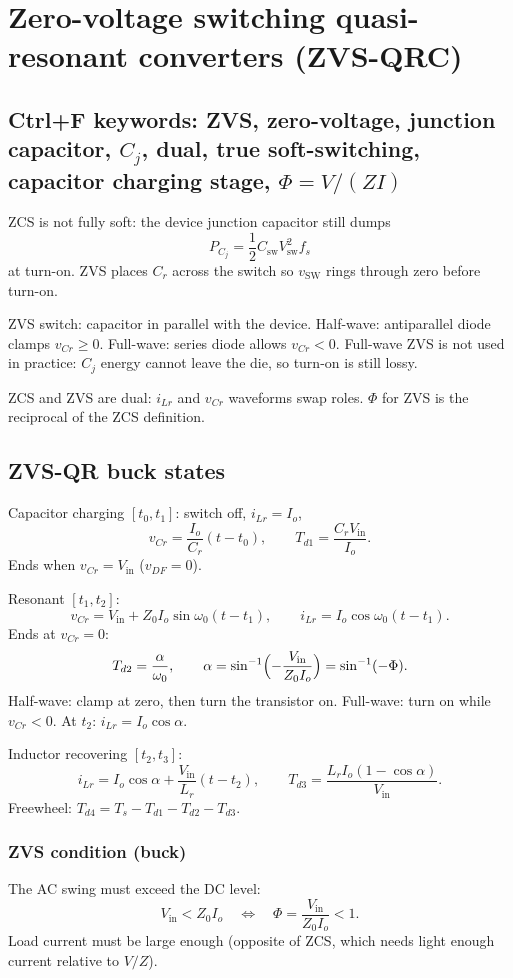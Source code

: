 \section{Zero-voltage switching quasi-resonant converters (ZVS-QRC)}

\subsection{Ctrl+F keywords: ZVS, zero-voltage, junction capacitor, \(C_j\), dual, true soft-switching, capacitor charging stage, \(\Phi=V/(ZI)\)}

ZCS is not fully soft: the device junction capacitor still dumps
\[
P_{C_j}=\frac12 C_{\mathrm{sw}} V_{\mathrm{sw}}^2 f_s
\]
at turn-on. ZVS places \(C_r\) across the switch so \(v_{\mathrm{SW}}\) rings through zero before turn-on.

ZVS switch: capacitor in parallel with the device. Half-wave: antiparallel diode clamps \(v_{Cr}\ge 0\). Full-wave: series diode allows \(v_{Cr}<0\). Full-wave ZVS is not used in practice: \(C_j\) energy cannot leave the die, so turn-on is still lossy.

ZCS and ZVS are dual: \(i_{Lr}\) and \(v_{Cr}\) waveforms swap roles. \(\Phi\) for ZVS is the reciprocal of the ZCS definition.

\subsection{ZVS-QR buck states}
Capacitor charging \([t_0,t_1]\): switch off, \(i_{Lr}=I_o\),
\[
v_{Cr}=\frac{I_o}{C_r}(t-t_0),\qquad T_{d1}=\frac{C_r V_{\mathrm{in}}}{I_o}.
\]
Ends when \(v_{Cr}=V_{\mathrm{in}}\) (\(v_{DF}=0\)).

Resonant \([t_1,t_2]\):
\[
v_{Cr}=V_{\mathrm{in}}+Z_0 I_o\sin\omega_0(t-t_1),\qquad
i_{Lr}=I_o\cos\omega_0(t-t_1).
\]
Ends at \(v_{Cr}=0\):
\[
T_{d2}=\frac{\alpha}{\omega_0},\qquad
\alpha=\sin^{-1}\Bigl(-\frac{V_{\mathrm{in}}}{Z_0 I_o}\Bigr)=\sin^{-1}(-\Phi).
\]
Half-wave: clamp at zero, then turn the transistor on. Full-wave: turn on while \(v_{Cr}<0\).
At \(t_2\): \(i_{Lr}=I_o\cos\alpha\).

Inductor recovering \([t_2,t_3]\):
\[
i_{Lr}=I_o\cos\alpha+\frac{V_{\mathrm{in}}}{L_r}(t-t_2),\qquad
T_{d3}=\frac{L_r I_o(1-\cos\alpha)}{V_{\mathrm{in}}}.
\]
Freewheel: \(T_{d4}=T_s-T_{d1}-T_{d2}-T_{d3}\).

\subsubsection{ZVS condition (buck)}
The AC swing must exceed the DC level:
\[
V_{\mathrm{in}}<Z_0 I_o \quad\Leftrightarrow\quad \Phi=\frac{V_{\mathrm{in}}}{Z_0 I_o}<1.
\]
Load current must be large enough (opposite of ZCS, which needs light enough current relative to \(V/Z\)).

